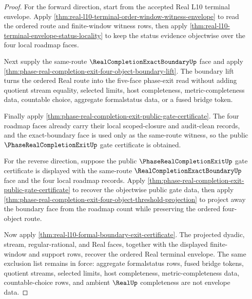\begin{proof}
For the forward direction, start from the accepted Real L10 terminal envelope. Apply \autoref{thm:real-l10-terminal-order-window-witness-envelope} to read the ordered route and finite-window witness rows, then apply \autoref{thm:real-l10-terminal-envelope-status-locality} to keep the status evidence objectwise over the four local roadmap faces.

Next supply the same-route $\RealCompletionExactBoundaryUp$ face and apply \autoref{thm:phase-real-completion-exit-four-object-boundary-lift}. The boundary lift turns the ordered Real route into the five-face phase-exit read without adding quotient stream equality, selected limits, host completeness, metric-completeness data, countable choice, aggregate formalstatus data, or a fused bridge token.

Finally apply \autoref{thm:phase-real-completion-exit-public-gate-certificate}. The four roadmap faces already carry their local scoped-closure and audit-clean records, and the exact-boundary face is used only as the same-route witness, so the public $\PhaseRealCompletionExitUp$ gate certificate is obtained.

For the reverse direction, suppose the public $\PhaseRealCompletionExitUp$ gate certificate is displayed with the same-route $\RealCompletionExactBoundaryUp$ face and the four local roadmap records. Apply \autoref{thm:phase-real-completion-exit-public-gate-certificate} to recover the objectwise public gate data, then apply \autoref{thm:phase-real-completion-exit-four-object-threshold-projection} to project away the boundary face from the roadmap count while preserving the ordered four-object route.

Now apply \autoref{thm:real-l10-formal-boundary-exit-certificate}. The projected dyadic, stream, regular-rational, and Real faces, together with the displayed finite-window and support rows, recover the ordered Real terminal envelope. The same exclusion list remains in force: aggregate formalstatus rows, fused bridge tokens, quotient streams, selected limits, host completeness, metric-completeness data, countable-choice rows, and ambient $\RealUp$ completeness are not envelope data.
\end{proof}

